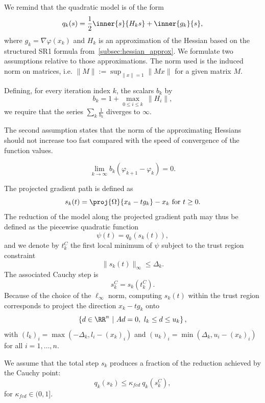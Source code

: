 We remind that the quadratic model is of the form
\[q_k(s) = \dfrac{1}{2} \inner{s}{H_ks} + \inner{g_k}{s},\]
where $g_k = \nabla \varphi(x_k)$ and $H_k$ is an approximation of the Hessian based on the structured SR1 formula from~\ref{subsec:hessian_approx}. We formulate two assumptions relative to those approximations. The norm used is the induced norm on matrices, i.e. $\|M\| := \sup_{\|x\|=1} \|Mx\|$ for a given matrix $M$.
\begin{assumption}\label{assumption:model_hessian}
	Defining, for every iteration index $k$, the scalars $b_k$ by 
	\[b_k = 1+\max_{0 \le i \le k} \ \left\| H_i\right\|,\]
	we require that the series $\sum_k \frac{1}{b_k}$ diverges to $\infty$.
\end{assumption}
The second assumption states that the norm of the approximating Hessians should not increase too fast compared with the speed of convergence of the function values.
\begin{assumption}\label{assumption:hessian_norm_compared_convergence_speed}
	\[\lim\limits_{k\to \infty} b_k (\varphi_{k+1}-\varphi_k) = 0.\]
\end{assumption}

The projected gradient path is defined as
\[s_k(t)=\proj{\Omega}{x_k-tg_k}-x_k \text{ for } t\ge 0.\]
The reduction of the model along the projected gradient path may thus be defined as the piecewise quadratic function
\[\psi(t) = q_k(s_k(t)),\]
and we denote by $t_k^C$ the first local minimum of $\psi$ subject to the trust region constraint 
\begin{equation*}
	\|s_k(t)\|_\infty \le \Delta_k.
\end{equation*}
The associated Cauchy step is 
\begin{equation*}
	s_k^C = s_k(t_k^C).
\end{equation*}
Because of the choice of the $\ell_\infty$ norm, computing $s_k(t)$ within the trust region corresponds to project the direction $x_k-tg_k$ onto
\begin{equation}\label{eq:proj_grad_feasible_set}
	\left\{d \in \RR^n \ | \ Ad=0,\ l_k \le d \le u_k\right\},
\end{equation}
with $(l_k)_i = \max\left(-\Delta_k,l_i-(x_k)_i\right)$ and $(u_k)_i = \min\left(\Delta_k,u_i-(x_k)_i\right)$ for all $i=1,\ldots,n$.

We assume that the total step $s_k$ produces a fraction of the reduction achieved by the Cauchy point:
\begin{equation}\label{eq:step_drecrease_wrt_cauchy}
	q_k(s_k) \le \kappa_{fcd} \ q_k(s_k^C),
\end{equation}
for $\kappa_{fcd} \in (0,1]$. 

